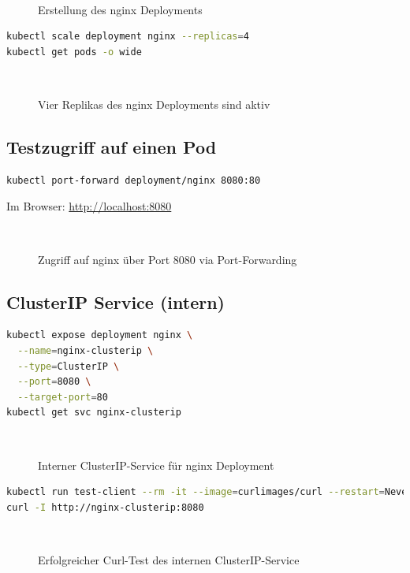 \documentclass[11pt,a4paper,twocolumn]{article}
\newcommand{\placeholderfig}[2]{%
  \begin{figure}[H]\centering
    \fbox{\rule{0pt}{0.3\linewidth}\rule{0.9\linewidth}{0pt}}\\[2mm]
    \caption{#1}\label{fig:#2}
  \end{figure}}
\begin{document}
\placeholderfig{Erstellung des nginx Deployments}{nginx-deploy}

\begin{lstlisting}[language=bash,caption={Deployment auf vier Replikas skalieren}]
kubectl scale deployment nginx --replicas=4
kubectl get pods -o wide
\end{lstlisting}

\placeholderfig{Vier Replikas des nginx Deployments sind aktiv}{scale-4replicas}

\subsection{Testzugriff auf einen Pod}

\begin{lstlisting}[language=bash,caption={Port-Forwarding für lokalen Zugriff}]
kubectl port-forward deployment/nginx 8080:80
\end{lstlisting}

Im Browser: \url{http://localhost:8080}

\placeholderfig{Zugriff auf nginx über Port 8080 via Port-Forwarding}{portforward}

\subsection{ClusterIP Service (intern)}

\begin{lstlisting}[language=bash,caption={Erstellung eines internen ClusterIP-Service}]
kubectl expose deployment nginx \
  --name=nginx-clusterip \
  --type=ClusterIP \
  --port=8080 \
  --target-port=80
kubectl get svc nginx-clusterip
\end{lstlisting}

\placeholderfig{Interner ClusterIP-Service für nginx Deployment}{clusterip}

\begin{lstlisting}[language=bash,caption={Test im Cluster über temporären Curl-Pod}]
kubectl run test-client --rm -it --image=curlimages/curl --restart=Never -- sh
curl -I http://nginx-clusterip:8080
\end{lstlisting}

\placeholderfig{Erfolgreicher Curl-Test des internen ClusterIP-Service}{clusterip-test}

\end{document}
